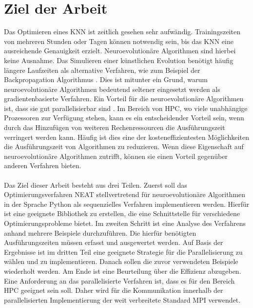 \section{Ziel der Arbeit}
Das Optimieren eines \ac{KNN} ist zeitlich gesehen sehr aufwändig. Trainingszeiten von mehreren Stunden oder Tagen können notwendig sein, bis das \ac{KNN} eine ausreichende Genauigkeit erzielt. Neuroevolutionäre Algorithmen sind hierbei keine Ausnahme. Das Simulieren einer künstlichen Evolution benötigt häufig längere Laufzeiten als alternative Verfahren, wie zum Beispiel der Backpropagation Algorithmus \cite{whitley1993genetic}. Dies ist mitunter ein Grund, warum neuroevolutionäre Algorithmen bedeutend seltener eingesetzt werden als gradientenbasierte Verfahren. Ein Vorteil für die neuroevolutionäre Algorithmen ist, dass sie gut parallelisierbar sind \cite{such2017deep}. Im Bereich von \ac{HPC}, wo viele unabhängige Prozessoren zur Verfügung stehen, kann es ein entscheidender Vorteil sein, wenn durch das Hinzufügen von weiteren Rechenressourcen die Ausführungszeit verringert werden kann. Häufig ist dies eine der kosteneffizientesten Möglichkeiten die Ausführungszeit von Algorithmen zu reduzieren. Wenn diese Eigenschaft auf neuroevolutionäre Algorithmen zutrifft, können sie einen Vorteil gegenüber anderen Verfahren bieten.
\\\\
Das Ziel dieser Arbeit besteht aus drei Teilen. Zuerst soll das Optimierungsverfahren \ac{NEAT} stellvertretend für neuroevolutionäre Algorithmen in der Sprache Python als sequenzielles Verfahren implementieren werden. Hierfür ist eine geeignete Bibliothek zu erstellen, die eine Schnittstelle für verschiedene Optimierungsprobleme bietet. Im zweiten Schritt ist eine Analyse des Verfahrens anhand mehrere Beispiele durchzuführen. Die hierfür benötigten Ausführungszeiten müssen erfasst und ausgewertet werden. Auf Basis der Ergebnisse ist im dritten Teil eine geeignete Strategie für die Parallelisierung zu wählen und zu implementieren. Danach sollen die zuvor verwendeten Beispiele wiederholt werden. Am Ende ist eine Beurteilung über die Effizienz abzugeben. Eine Anforderung an das parallelisierte Verfahren ist, dass es für den Bereich \ac{HPC} geeignet sein soll. Daher wird für die Kommunikation innerhalb der parallelisierten Implementierung der weit verbreitete Standard \ac{MPI} verwendet. 



